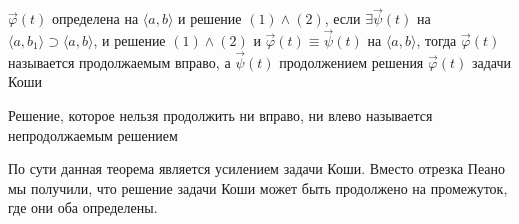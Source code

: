     \begin{definition} 
        $\Vec{\varphi}(t)$ определена на $\langle a, b\rangle$ и решение $(1) \wedge (2)$, если $\exists \Vec{\psi}(t)$ на $\langle a, b_1\rangle \supset \langle a, b\rangle$, и решение $(1) \wedge (2)$ и $\Vec{\varphi}(t) \equiv \Vec{\psi}(t)$ на $\langle a, b\rangle$, тогда $\Vec{\varphi}(t)$ называется продолжаемым вправо, а $\Vec{\psi}(t)$ продолжением решения $\Vec{\varphi}(t)$ задачи Коши
    \end{definition}
    
    \begin{definition} 
        Решение, которое нельзя продолжить ни вправо, ни влево называется непродолжаемым решением
    \end{definition}
    
    \begin{remark}
        По сути данная теорема является усилением задачи Коши. Вместо отрезка Пеано мы получили, что решение задачи Коши может быть продолжено на промежуток, где они оба определены.
    \end{remark}
    
